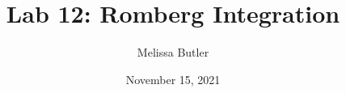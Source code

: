 \newcommand{\course}{MATH 3341}
\title{Lab 12: Romberg Integration}
\author{Melissa Butler}
\date{November 15, 2021}
